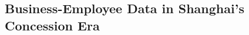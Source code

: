 \documentclass[12pt]{article}
\begin{document}



\subsection{Business-Employee Data in Shanghai's Concession Era}
\end{document}
